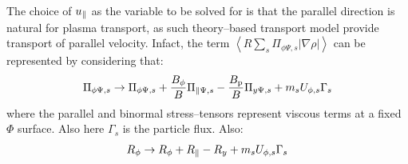 The choice of $u_\parallel$ as the variable to be solved for is that the parallel direction is natural for plasma transport, as such theory--based transport model provide transport of parallel velocity.
Infact, the term $\displaystyle \left\langle R \sum_s \Pi_{\phi\Psi,s}
|\nabla{\rho}| \right\rangle$ can be represented by considering that:
\begin{eqnarray}
 \Pi_{\phi\Psi,s} \rightarrow  \Pi_{\phi\Psi,s}+\frac{B_{\phi}}{B}\Pi_{\parallel\Psi,s}-\frac{B_{\rm p}}{B}\Pi_{y\Psi,s}+m_s U_{\phi,s} \Gamma_s
\label{stresstensorparperp}
\end{eqnarray} 
where the parallel and binormal stress--tensors represent viscous terms at a fixed $\Phi$ surface. Also here $\Gamma_s$ is the particle flux.
Also:
\begin{eqnarray}
R_\phi \rightarrow  R_\phi+R_\parallel-R_y+m_s U_{\phi,s} \Gamma_s
\label{stresstensorparperp}
\end{eqnarray} 



